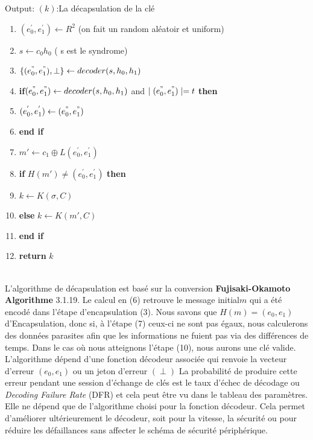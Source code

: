 \documentclass[12pt,openany]{report}
\begin{document}
Output: $(k)$:La décapsulation de la clé\\
\begin{enumerate}
\item $(e^{'}_0,e^{'}_1)\gets \mathit{R}^2$ \Comment(on fait un random aléatoir et uniform)
\item $s\gets c_0h_0$ \Comment( s est le syndrome)
\item $\lbrace (e^{"}_0,e^{"}_1),\perp \rbrace  \gets decoder(s,h_0,h_1)$ 
\item \textbf{if}$(e^{"}_0,e^{"}_1)\gets decoder(s,h_0,h_1)$ and $\mid (e^{"}_0,e^{"}_1)\mid=t$ \textbf{then}
\item \hspace{0.3cm} $(e^{'}_0,e^{'}_1)\gets (e^{"}_0,e^{"}_1)$
\item \textbf{end if}
\item $m'\gets c_1\oplus \mathit{L}(e^{'}_0,e^{'}_1)$
\item \textbf{if} $\mathit{H}(m')\neq (e^{'}_0,e^{'}_1)$ \textbf{then}
\item \hspace{0.3cm} $k\gets \mathit{K}(\sigma,\mathit{C})$
\item \textbf{else}
$k\gets \mathit{K}(m',\mathit{C})$
\item \textbf{end if}
\item \textbf{return}\hspace{0.1cm} $k$
\end{enumerate}
\noindent\hrulefill\\

L'algorithme de décapsulation est basé sur la conversion \textbf{Fujisaki-Okamoto Algorithme} 3.1.19. Le calcul en (6) retrouve le message initial$ m$ qui a été encodé dans l'étape d'encapsulation (3). Nous savons que\hspace{0.2cm} $\mathit{H}(m) = (e_0, e_1)$ d'Encapsulation, donc si,
à l'étape (7) ceux-ci ne sont pas égaux, nous calculerons des données parasites afin que les informations ne fuient pas via des différences de temps. Dans le cas où nous atteignons l'étape (10), nous aurons une clé valide.\\

L'algorithme dépend d'une fonction décodeur associée qui renvoie la
vecteur d'erreur $(e_0, e_1)$ ou un jeton d'erreur $(\perp)$ La probabilité de produire cette erreur
pendant une session d'échange de clés est le taux d'échec de décodage ou \textit{Decoding Failure Rate} (DFR) et cela peut être vu dans le tableau des paramètres. Elle ne dépend que de l'algorithme choisi pour
la fonction décodeur. Cela permet d'améliorer ultérieurement le décodeur, soit pour
la vitesse, la sécurité ou pour réduire les défaillances sans affecter le schéma de sécurité périphérique.
\end{document}

